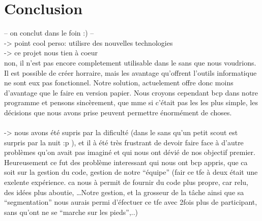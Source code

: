 \chapter*{Conclusion}

-- on conclut dans le foin :) --\\

->  point cool perso: utilisre des nouvelles technologies \\

->  ce projet nous tien à coeur \\
non, il n'est pas encore completement utilisable dans le sans que nous voudrions.
Il est possible de créer horraire, mais les avantage qu'offrent l'outils informatique ne sont eux pas fonctionnel. Notre solution, actuelement offre donc moins d'avantage que le faire en version papier.  Nous croyons cependant bcp dans notre programme et pensons sincèrement, que mme si c'était pas les les plus simple, les décisions que nous avons prise peuvent permettre énormément de choses.  \\\\

-> nous avons été supris par la dificulté (dans le sans qu'un petit scout est
surpris par la nuit :p ), et il à été très frustrant de devoir faire face à
d'autre problèmes qu'on avait pas imaginé et qui nous ont dévié de nos objectif
premier.  Heureusement ce fut des problème interessant qui nous ont bcp appris,
que ca soit sur la gestion du code, gestion de notre ``équipe'' (fair ce tfe à
deux était une exelente expérience. ca nous à permit de fournir du code plus
propre, car relu, des idées plus aboutie, \ldots Notre gestion, et la grosseur
de la tâche ainsi que sa ``segmentation'' nous aurais permi d'éfectuer ce tfe
avec 2fois plus de participant, sans qu'ont ne se ``marche sur les pieds'',..)
